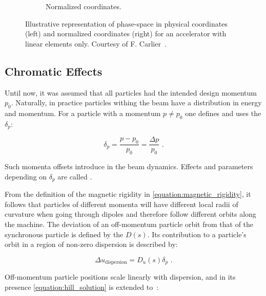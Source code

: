 \begin{figure}[!hbt]
\begin{center}
\begin{subfigure}[b]{0.45\textwidth}
\begin{center}
        \caption{Normalized coordinates.}
        \label{fig:phase_space_normalized}
        \end{center}
    \end{subfigure}
    \caption{ Illustrative representation of phase-space in physical coordinates (left) and normalized coordinates (right) for an accelerator with linear elements only. Courtesy of F. Carlier~\cite{PHD:Carlier}.}
    \label{figure:phase_space_linear_physical_normalized_coordinates}
    \end{center}
\end{figure}

\subsection{Chromatic Effects}
\label{subsection:chromatic_effects}

Until now, it was assumed that all particles had the intended design momentum \(p_{0}\).
Naturally, in practice particles withing the beam have a distribution in energy and momentum.
For a particle with a momentum \(p \neq p_{0}\) one defines and uses the  \(\delta_p\):

\begin{equation}
    \delta_p = \frac{p - p_0}{p_0} = \frac{\Delta p}{p_0} \text{ .}
    \label{equation:momentum_deviation}
\end{equation}

Such momenta offsets introduce  in the beam dynamics.
Effects and parameters depending on \(\delta_p\) are called .

From the definition of the magnetic rigidity in \cref{equation:magnetic_rigidity}, it follows that particles of different momenta will have different local radii of curvature when going through dipoles and therefore follow different orbits along the machine.
The deviation of an off-momentum particle orbit from that of the synchronous particle is defined by the  \(D(s)\).
Its contribution to a particle's orbit in a region of non-zero dispersion is described by:

\begin{equation}
    \Delta u_{\mathrm{dispersion}} = D_{u}(s) \delta_p \text{ .}
    \label{equation:dispersion_contribution_to_orbit}
\end{equation}
\bigbreak

Off-momentum particle positions scale linearly with dispersion, and in its presence \cref{equation:hill_solution} is extended to~\cite{BOOK:Wiedemann:Particle_Accelerator_Physics}:

